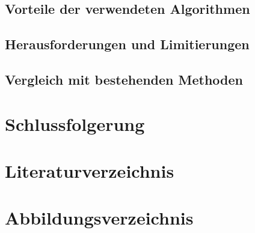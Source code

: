 \documentclass[a4paper,12pt,twoside]{article}
\begin{document}
\subsection{Vorteile der verwendeten Algorithmen}
\subsection{Herausforderungen und Limitierungen}
\subsection{Vergleich mit bestehenden Methoden}

\section{Schlussfolgerung}
\section{Literaturverzeichnis}
\section{Abbildungsverzeichnis}
\end{document}
